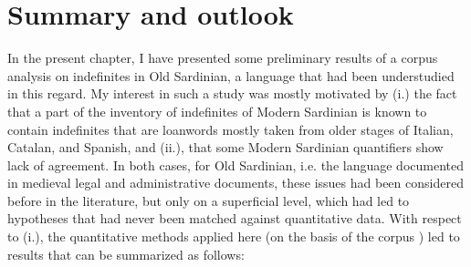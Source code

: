 \documentclass[output=paper,colorlinks,citecolor=brown]{langscibook}
\begin{document}
\section{Summary and outlook}\label{sec:men6}

In the present chapter, I have presented some preliminary results of a corpus analysis on indefinites in Old Sardinian, a language that had been understudied in this regard. My interest in such a study was mostly motivated by (i.) the fact that a part of the inventory of indefinites of Modern Sardinian is known to contain indefinites that are loanwords mostly taken from older stages of Italian, Catalan, and Spanish, and (ii.), that some Modern Sardinian quantifiers show lack of agreement. In both cases, for Old Sardinian, i.e. the language documented in medieval legal and administrative documents, these issues had been considered before in the literature, but only on a superficial level, which had led to hypotheses that had never been matched against quantitative data. With respect to (i.), the quantitative methods applied here (on the basis of the corpus ) led to results that can be summarized as follows:
\end{document}
